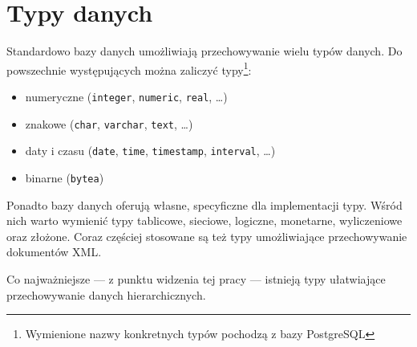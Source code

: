 \chapter{Typy danych}


%
%
%
%


Standardowo bazy danych umożliwiają przechowywanie wielu typów danych.
Do powszechnie występujących można zaliczyć typy\footnote{Wymienione nazwy konkretnych typów pochodzą z bazy PostgreSQL}:
\begin{itemize}
    \item numeryczne
        (\verb|integer|, \verb|numeric|, \verb|real|, \ldots)
    \item znakowe
        (\verb|char|, \verb|varchar|, \verb|text|, \ldots)
    \item daty i czasu
        (\verb|date|, \verb|time|, \verb|timestamp|, \verb|interval|, \ldots)
    \item binarne
        (\verb|bytea|)
\end{itemize}

Ponadto bazy danych oferują własne, specyficzne dla implementacji typy.
Wśród nich warto wymienić typy tablicowe, sieciowe, logiczne, monetarne, wyliczeniowe oraz złożone.
Coraz częściej stosowane są też typy umożliwiające przechowywanie dokumentów XML.


Co najważniejsze --- z punktu widzenia tej pracy --- istnieją typy ułatwiające przechowywanie danych hierarchicznych.


 